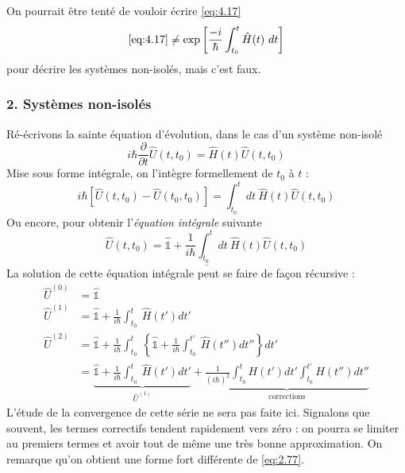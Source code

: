 		On pourrait être tenté de vouloir écrire \autoref{eq:4.17} 
		\begin{equation}
		\autoref{eq:4.17} \neq \exp\left[\dfrac{-i}{\hbar}\int_{t_0}^t \hat{H}(t)\ dt\right]
		\label{eq:2.77}
		\end{equation}
		pour décrire les systèmes non-isolés, mais c'est faux.
		
		\subsubsection{2. Systèmes non-isolés}
		Ré-écrivons la sainte équation d'évolution, dans le cas d'un système non-isolé
		\begin{equation}
		i\hbar\dfrac{\partial}{\partial t}\hat{U}(t,t_0) = \hat{H}(t)\hat{U}(t,t_0)
		\end{equation}
		Mise sous forme intégrale, on l'intègre formellement de $t_0$ à $t$ :
		\begin{equation}
		i\hbar\left[\hat{U}(t,t_0) - \hat{U}(t_0,t_0)\right] = \int_{t_0}^t dt\ \hat{H}(t)\hat{U}(t,t_0)
		\end{equation}
		Ou encore, pour obtenir l'\textit{équation intégrale} suivante
		\begin{equation}
		\underline{	\hat{U}(t,t_0) = \hat{\mathbb{1}} + \frac{1}{i\hbar}\int_{t_0}^t dt\ \hat{H}(t)\hat{U}(t,t_0)}
		\end{equation}
		La solution de cette équation intégrale peut se faire de façon récursive :
		\begin{equation}
		\begin{array}{ll}
		\hat{U}^{(0)} &= \hat{\mathbb{1}}\\
		\hat{U}^{(1)} &= \hat{\mathbb{1}} + \frac{1}{i\hbar}\int_{t_0}^t\ \hat{H}(t') dt'\\
		\hat{U}^{(2)} &= \hat{\mathbb{1}} + \frac{1}{i\hbar}\int_{t_0}^t\ \left\{ 
		\hat{\mathbb{1}} + \frac{1}{i\hbar}\int_{t_0}^{t'}\ \hat{H}(t'') dt''	\right\} dt'		\\
		&= \underbrace{\hat{\mathbb{1}} + \frac{1}{i\hbar}\int_{t_0}^t\ \hat{H}(t') dt'}_{\hat{U}^{(1)}} + 		
		\underbrace{\frac{1}{(i\hbar)^2}\int_{t_0}^t H(t')dt'\int_{t_0}^{t'} H(t'')dt''}_{\text{corrections}}
		\end{array}
		\end{equation}
		L'étude de la convergence de cette série ne sera pas faite ici. Signalons que souvent, les 
		termes correctifs tendent rapidement vers zéro : on pourra se limiter au premiers termes et 
		avoir tout de même une très bonne approximation. On remarque qu'on obtient une forme fort
		différente de \autoref{eq:2.77}.

